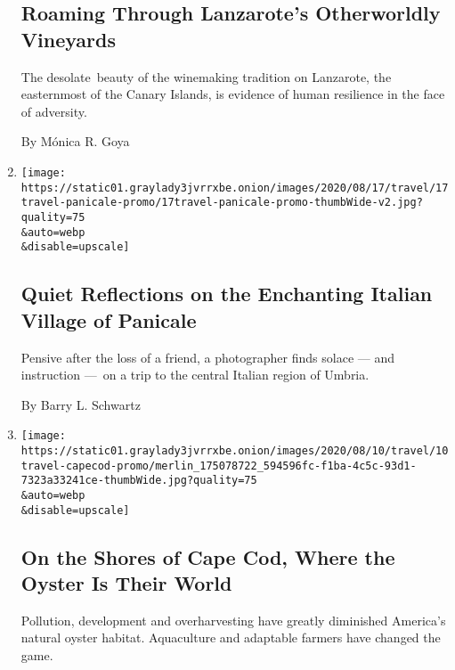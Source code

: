 \begin{enumerate}
  \hypertarget{roaming-through-lanzarotes-otherworldly-vineyards}{%
  \subsection{Roaming Through Lanzarote's Otherworldly
  Vineyards}\label{roaming-through-lanzarotes-otherworldly-vineyards}}

  The desolate~beauty of the winemaking tradition on Lanzarote, the
  easternmost of the Canary Islands, is evidence of human resilience in
  the face of adversity.

  By Mónica R. Goya
\item
  \href{/2020/08/17/travel/panicale-italy.html}{}

  \texttt{[image: https://static01.graylady3jvrrxbe.onion/images/2020/08/17/travel/17travel-panicale-promo/17travel-panicale-promo-thumbWide-v2.jpg?quality=75\\\&auto=webp\\\&disable=upscale]}

  \hypertarget{quiet-reflections-on-the-enchanting-italian-village-of-panicale}{%
  \subsection{Quiet Reflections on the Enchanting Italian Village of
  Panicale}\label{quiet-reflections-on-the-enchanting-italian-village-of-panicale}}

  Pensive after the loss of a friend, a photographer finds solace ---
  and instruction ---~on a trip to the central Italian region of Umbria.

  By Barry L. Schwartz
\item
  \href{/2020/08/10/travel/cape-cod-oysters.html}{}

  \texttt{[image: https://static01.graylady3jvrrxbe.onion/images/2020/08/10/travel/10travel-capecod-promo/merlin\_175078722\_594596fc-f1ba-4c5c-93d1-7323a33241ce-thumbWide.jpg?quality=75\\\&auto=webp\\\&disable=upscale]}

  \hypertarget{on-the-shores-of-cape-cod-where-the-oyster-is-their-world}{%
  \subsection{On the Shores of Cape Cod, Where the Oyster Is Their
  World}\label{on-the-shores-of-cape-cod-where-the-oyster-is-their-world}}

  Pollution, development and overharvesting have greatly diminished
  America's natural oyster habitat. Aquaculture and adaptable farmers
  have changed the game.


\end{enumerate}

